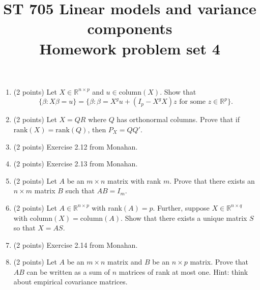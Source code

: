 \documentclass[11pt]{article}
\title{ST 705 Linear models and variance components \\ 
        Homework problem set 4}
\begin{document}
\maketitle

\begin{enumerate}

\item(2 points) Let $X \in \mathbb{R}^{n\times p}$ and $u \in \text{column}(X)$.  Show that 
\[
\{\beta : X\beta = u\} = \{\beta : \beta = X^{g}u + (I_{p} - X^{g}X)z \text{ for some } z \in \mathbb{R}^{p}\}.
\]

\item(2 points) Let $X = QR$ where $Q$ has orthonormal columns.  Prove that if $\text{rank}(X) = \text{rank}(Q)$, then $P_{X} = QQ'$.

\item(2 points) Exercise 2.12 from Monahan.

\item(2 points) Exercise 2.13 from Monahan.

\item(2 points) Let $A$ be an $m\times n$ matrix with rank $m$.  Prove that there exists an $n\times m$ matrix $B$ such that $AB = I_{m}$.

\item(2 points) Let $A \in \mathbb{R}^{n\times p}$ with rank$(A) = p$.  Further, suppose  $X \in \mathbb{R}^{n\times q}$ with $\text{column}(X) = \text{column}(A)$.  Show that there exists a unique matrix $S$ so that $X = AS$.

\item(2 points) Exercise 2.14 from Monahan.

\item(2 points) Let $A$ be an $m\times n$ matrix and $B$ be an $n\times p$ matrix.  Prove that $AB$ can be written as a sum of $n$ matrices of rank at most one.  Hint: think about empirical covariance matrices.

\end{enumerate}
\end{document}
